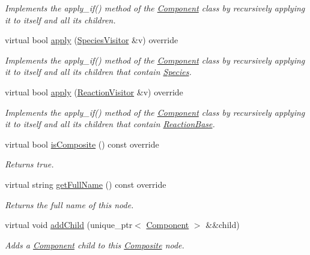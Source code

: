 \begin{DoxyCompactItemize}
\begin{DoxyCompactList}\small\item\em Implements the apply\+\_\+if() method of the \hyperlink{classComponent}{Component} class by recursively applying it to itself and all its children. \end{DoxyCompactList}\item 
virtual bool \hyperlink{classComposite_a18937a1f6f84a159e77ba83dd34b2e20}{apply} (\hyperlink{classSpeciesVisitor}{Species\+Visitor} \&v) override
\begin{DoxyCompactList}\small\item\em Implements the apply\+\_\+if() method of the \hyperlink{classComponent}{Component} class by recursively applying it to itself and all its children that contain \hyperlink{classSpecies}{Species}. \end{DoxyCompactList}\item 
virtual bool \hyperlink{classComposite_aa4a608ee92aaaa6e0d63278595707474}{apply} (\hyperlink{classReactionVisitor}{Reaction\+Visitor} \&v) override
\begin{DoxyCompactList}\small\item\em Implements the apply\+\_\+if() method of the \hyperlink{classComponent}{Component} class by recursively applying it to itself and all its children that contain \hyperlink{classReactionBase}{Reaction\+Base}. \end{DoxyCompactList}\item 
virtual bool \hyperlink{classComposite_ae2c806010c5c1d2d166ce01f2710c271}{is\+Composite} () const override
\begin{DoxyCompactList}\small\item\em Returns true. \end{DoxyCompactList}\item 
virtual string \hyperlink{classComposite_a0219bb2449696a3ab84ff24e4462e2c2}{get\+Full\+Name} () const override
\begin{DoxyCompactList}\small\item\em Returns the full name of this node. \end{DoxyCompactList}\item 
virtual void \hyperlink{classComposite_aa3ebdb54e65379954e5f28cd84f00be0}{add\+Child} (unique\+\_\+ptr$<$ \hyperlink{classComponent}{Component} $>$ \&\&child)
\begin{DoxyCompactList}\small\item\em Adds a \hyperlink{classComponent}{Component} child to this \hyperlink{classComposite}{Composite} node. \end{DoxyCompactList}\item 

\end{DoxyCompactItemize}
